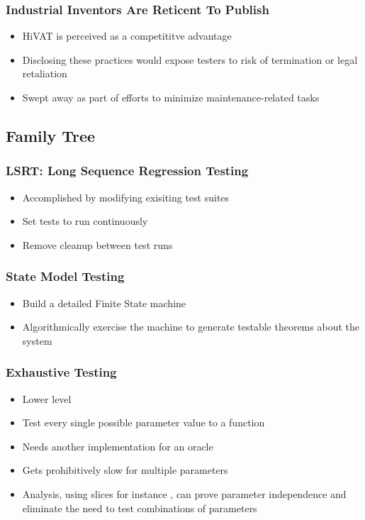 \begin{frame}
  \frametitle{Industrial Inventors Are Reticent To Publish}
  \begin{itemize}
    \item HiVAT is perceived as a competititve advantage
    \item Disclosing these practices would expose testers to risk of termination or legal retaliation
    \item Swept away as part of efforts to minimize maintenance-related tasks
  \end{itemize}
\end{frame}

\subsection{Family Tree}

\begin{frame}
  \frametitle{LSRT: Long Sequence Regression Testing}
  \begin{itemize}
    \item Accomplished by modifying exisiting test suites
    \item Set tests to run continuously
    \item Remove cleanup between test runs
  \end{itemize}
\end{frame}

\begin{frame}
  \frametitle{State Model Testing}
  \begin{itemize}
    \item Build a detailed Finite State machine
    \item Algorithmically exercise the machine to generate testable theorems about the system
  \end{itemize}
  \citep{lee1996principles}
\end{frame}

\begin{frame}
  \frametitle{Exhaustive Testing}
  \begin{itemize}
    \item Lower level
    \item Test every single possible parameter value to a function
    \item Needs another implementation for an oracle
    \item Gets prohibitively slow for multiple parameters
    \item Analysis, using slices for instance \citep{gallagher1991using}, can prove parameter independence and eliminate the need to test combinations of parameters
  \end{itemize}
\end{frame}

